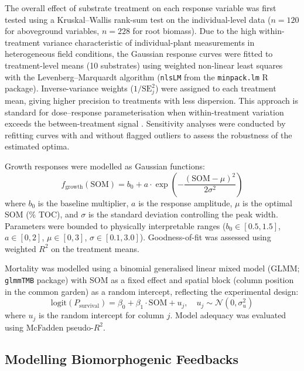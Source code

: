 \documentclass[authoryear,preprint,review,12pt]{elsarticle}
\newcommand{\SOM}{\mathrm{SOM}}
\begin{document}
The overall effect of substrate treatment on each response variable was first tested using a Kruskal--Wallis rank-sum test on the individual-level data ($n = 120$ for aboveground variables, $n = 228$ for root biomass). Due to the high within-treatment variance characteristic of individual-plant measurements in heterogeneous field conditions, the Gaussian response curves were fitted to treatment-level means (10 substrates) using weighted non-linear least squares with the Levenberg--Marquardt algorithm (\texttt{nlsLM} from the \texttt{minpack.lm} R package). Inverse-variance weights ($1/\text{SE}^2_j$) were assigned to each treatment mean, giving higher precision to treatments with less dispersion. This approach is standard for dose--response parameterisation when within-treatment variation exceeds the between-treatment signal \citep{ritz2015dose}. Sensitivity analyses were conducted by refitting curves with and without flagged outliers to assess the robustness of the estimated optima.

Growth responses were modelled as Gaussian functions:
\begin{equation}
f_{\text{growth}}(\SOM) = b_0 + a \cdot \exp\left(-\frac{(\SOM - \mu)^2}{2\sigma^2}\right)
\label{eq:gaussian_som}
\end{equation}
where $b_0$ is the baseline multiplier, $a$ is the response amplitude, $\mu$ is the optimal SOM (\% TOC), and $\sigma$ is the standard deviation controlling the peak width. Parameters were bounded to physically interpretable ranges ($b_0 \in [0.5, 1.5]$, $a \in [0, 2]$, $\mu \in [0, 3]$, $\sigma \in [0.1, 3.0]$). Goodness-of-fit was assessed using weighted $R^2$ on the treatment means.

Mortality was modelled using a binomial generalised linear mixed model (GLMM; \texttt{glmmTMB} package) with SOM as a fixed effect and spatial block (column position in the common garden) as a random intercept, reflecting the experimental design:
\begin{equation}
\mathrm{logit}(P_{\mathrm{survival}}) = \beta_0 + \beta_1 \cdot \SOM + u_j, \quad u_j \sim \mathcal{N}(0, \sigma^2_u)
\label{eq:mortality_glmm}
\end{equation}
where $u_j$ is the random intercept for column $j$. Model adequacy was evaluated using McFadden pseudo-$R^2$.


\subsection{Modelling Biomorphogenic Feedbacks}
\end{document}
